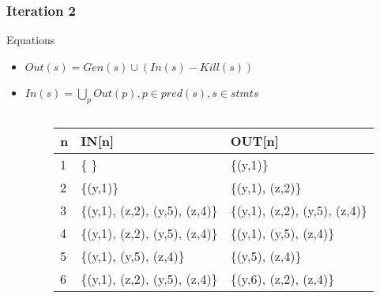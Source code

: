 \begin{frame}[fragile, t]
	\frametitle{Iteration 2} 
	
	\begin{center}
		\begin{scriptsize}
			\begin{minipage}{8cm}
				\begin{block}{Equations}
					\begin{itemize}
						\item $Out(s) = Gen(s) \cup (In(s) - Kill(s))$  
						\item $In(s) = \bigcup_p Out(p), p \in pred(s), s \in stmts$
					\end{itemize}
				\end{block}
			\end{minipage}
		\end{scriptsize}
	\end{center}
	
	\begin{columns}[T]
		\begin{column}[T]{.3\textwidth}
			\vspace{0pt}
			
		\end{column}
		\begin{column}[T]{.7\textwidth}
			\vspace{0pt}    
			\begin{scriptsize}
				\begin{table}[]
					\begin{tabular}{|l|l|l|}
						\hline
						n & IN{[}n{]} & OUT{[}n{]} \\ \hline
						1  & \{ \} & \{(y,1)\} \pause \\ \hline
						2  & \{(y,1)\} & \{(y,1), (z,2)\} \pause \\ \hline
						3  & \{(y,1), (z,2), (y,5), (z,4)\} & \{(y,1), (z,2), (y,5), (z,4)\} \pause \\ \hline
						4  & \{(y,1), (z,2), (y,5), (z,4)\} & \{(y,1), (y,5), (z,4)\} \pause \\ \hline
						5  & \{(y,1), (y,5), (z,4)\} & \{(y,5), (z,4)\} \pause \\ \hline
						6  & \{(y,1), (z,2), (y,5), (z,4)\} & \{(y,6), (z,2), (z,4)\} \\ \hline
					\end{tabular}
				\end{table}   
			\end{scriptsize}
		\end{column}
		
	\end{columns}
	
\end{frame}



